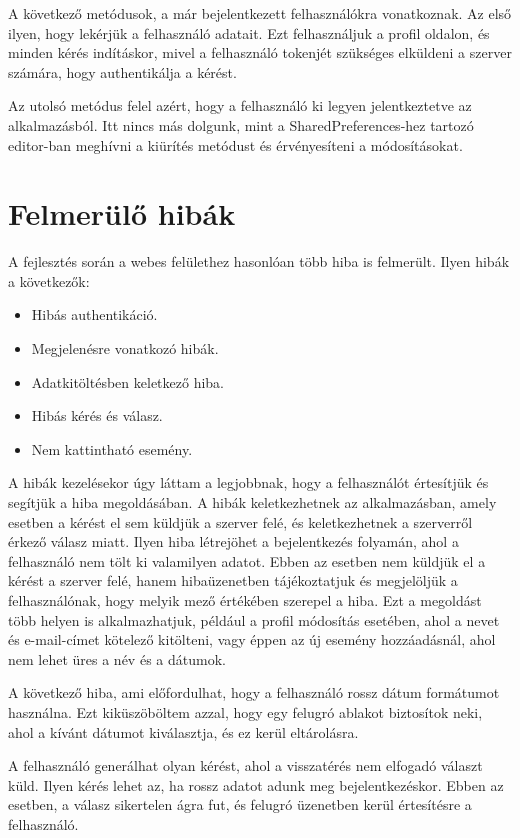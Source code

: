 \documentclass[
]{thesis-ekf}
\theoremstyle{definition}
\theoremstyle{remark}
\begin{document}
	A következő metódusok, a már bejelentkezett felhasználókra vonatkoznak. Az első ilyen, hogy lekérjük a felhasználó adatait. Ezt felhasználjuk a profil oldalon, és minden kérés indításkor, mivel a felhasználó tokenjét szükséges elküldeni a szerver számára, hogy authentikálja a kérést.
	
	Az utolsó metódus felel azért, hogy a felhasználó ki legyen jelentkeztetve az alkalmazásból. Itt nincs más dolgunk, mint a SharedPreferences-hez tartozó editor-ban meghívni a kiürítés metódust és érvényesíteni a módosításokat.  
	
	\section{Felmerülő hibák}
	A fejlesztés során a webes felülethez hasonlóan több hiba is felmerült. Ilyen hibák a következők:
	\begin{itemize}
		\item Hibás authentikáció.
		\item Megjelenésre vonatkozó hibák.
		\item Adatkitöltésben keletkező hiba.
		\item Hibás kérés és válasz.
		\item Nem kattintható esemény.
	\end{itemize}
	A hibák kezelésekor úgy láttam a legjobbnak, hogy a felhasználót értesítjük és segítjük a hiba megoldásában. A hibák keletkezhetnek az alkalmazásban, amely esetben a kérést el sem küldjük a szerver felé, és keletkezhetnek a szerverről érkező válasz miatt. Ilyen hiba létrejöhet a bejelentkezés folyamán, ahol a felhasználó nem tölt ki valamilyen adatot. Ebben az esetben nem küldjük el a kérést a szerver felé, hanem hibaüzenetben tájékoztatjuk és megjelöljük a felhasználónak, hogy melyik mező értékében szerepel a hiba. Ezt a megoldást több helyen is alkalmazhatjuk, például a profil módosítás esetében, ahol a nevet és e-mail-címet kötelező kitölteni, vagy éppen az új esemény hozzáadásnál, ahol nem lehet üres a név és a dátumok. 
	
	A következő hiba, ami előfordulhat, hogy a felhasználó rossz dátum formátumot használna. Ezt kiküszöböltem azzal, hogy egy felugró ablakot biztosítok neki, ahol a kívánt dátumot kiválasztja, és ez kerül eltárolásra. 
	
	A felhasználó generálhat olyan kérést, ahol a visszatérés nem elfogadó választ küld. Ilyen kérés lehet az, ha rossz adatot adunk meg bejelentkezéskor. Ebben az esetben, a válasz sikertelen ágra fut, és felugró üzenetben kerül értesítésre a felhasználó. 
	
\end{document}
